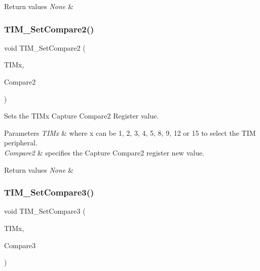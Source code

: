 \begin{DoxyRetVals}{Return values}
{\em None} & \\
\hline
\end{DoxyRetVals}
\mbox{\label{group___t_i_m___exported___functions_ga0175ef4fabade443909002a63d4e9758}} 
\subsubsection{\texorpdfstring{TIM\_SetCompare2()}{TIM\_SetCompare2()}}
{\footnotesize\ttfamily void T\+I\+M\+\_\+\+Set\+Compare2 (\begin{DoxyParamCaption}\item[{\mbox{\hyperlink{struct_t_i_m___type_def}{T\+I\+M\+\_\+\+Type\+Def}} $\ast$}]{T\+I\+Mx,  }\item[{uint16\+\_\+t}]{Compare2 }\end{DoxyParamCaption})}



Sets the T\+I\+Mx Capture Compare2 Register value. 


\begin{DoxyParams}{Parameters}
{\em T\+I\+Mx} & where x can be 1, 2, 3, 4, 5, 8, 9, 12 or 15 to select the T\+IM peripheral. \\
\hline
{\em Compare2} & specifies the Capture Compare2 register new value. \\
\hline
\end{DoxyParams}

\begin{DoxyRetVals}{Return values}
{\em None} & \\
\hline
\end{DoxyRetVals}
\mbox{\label{group___t_i_m___exported___functions_ga416df50f4223351e366ae40a4ec163ae}} 
\subsubsection{\texorpdfstring{TIM\_SetCompare3()}{TIM\_SetCompare3()}}
{\footnotesize\ttfamily void T\+I\+M\+\_\+\+Set\+Compare3 (\begin{DoxyParamCaption}\item[{\mbox{\hyperlink{struct_t_i_m___type_def}{T\+I\+M\+\_\+\+Type\+Def}} $\ast$}]{T\+I\+Mx,  }\item[{uint16\+\_\+t}]{Compare3 }\end{DoxyParamCaption})}



